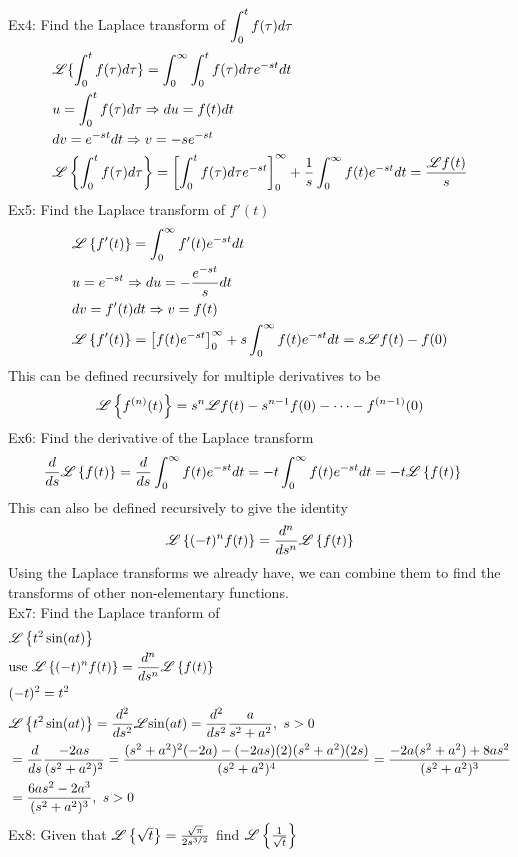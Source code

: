\documentclass[11pt, fleqn]{article}
\begin{document}
Ex4: Find the Laplace transform of $\displaystyle\int_0^t f(\tau)d\tau$
\begin{align*}
    &\mathscr{L}\{\int_0^t f(\tau)d\tau\}=\int_0^\infty\int_0^t f(\tau)d\tau e^{-st}dt\\
    &u=\int_0^t f(\tau)d\tau\Rightarrow du=f(t)dt\\
    &dv=e^{-st}dt\Rightarrow v=-se^{-st}\\
    &\mathscr{L}\left\{ \int_0^t f(\tau)d\tau \right\}=\left[ \int_0^t f(\tau)d\tau e^{-st} \right]_0^\infty+\frac{1}{s}\int_0^\infty f(t)e^{-st}dt=\frac{\mathscr{L}{f(t)}}{s}
\end{align*}
Ex5: Find the Laplace transform of $f'(t)$
\begin{align*}
    &\mathscr{L}\left\{ f'(t) \right\}=\int_0^\infty f'(t)e^{-st}dt\\
    &u=e^{-st}\Rightarrow du=-\frac{e^{-st}}{s}dt\\
    &dv=f'(t)dt\Rightarrow v=f(t)\\
    &\mathscr{L}\left\{ f'(t) \right\}=\left[ f(t)e^{-st} \right]_0^\infty+s\int_0^\infty f(t)e^{-st}dt=s\mathscr{L}{f(t)}-f(0)
\end{align*}
This can be defined recursively for multiple derivatives to be
$$\mathscr{L}\left\{ f^{(n)}(t) \right\}=s^n\mathscr{L}{f(t)}-s^{n-1}f(0)-\cdots-f^{(n-1)}(0)$$
Ex6: Find the derivative of the Laplace transform
\begin{align*}
    &\frac{d}{ds}\mathscr{L}\left\{ f(t) \right\}=\frac{d}{ds}\int_0^\infty f(t)e^{-st}dt=-t\int_0^{\infty}f(t)e^{-st}dt=-t\mathscr{L}\left\{ f(t) \right\}
\end{align*}
This can also be defined recursively to give the identity
$$\mathscr{L}\left\{ (-t)^nf(t) \right\}=\frac{d^n}{ds^n}\mathscr{L}\left\{ f(t) \right\}$$
Using the Laplace transforms we already have, we can combine them to find the transforms of other non-elementary functions.\\
Ex7: Find the Laplace tranform of 
\begin{align*}
    &\lap\brcurly{t^2\sin(at)}\\
    &\text{use }\lap\brcurly{(-t)^nf(t)}=\frac{d^n}{ds^n}\lap\brcurly{f(t)}\\
    &(-t)^2=t^2\\
    &\lap\brcurly{t^2\sin(at)}=\frac{d^2}{ds^2}\lap{\sin(at)}=\frac{d^2}{ds^2}\frac{a}{s^2+a^2},\ s>0\\
    &=\frac{d}{ds}\frac{-2as}{(s^2+a^2)^2}=\frac{(s^2+a^2)^2(-2a)-(-2as)(2)(s^2+a^2)(2s)}{(s^2+a^2)^4}=\frac{-2a(s^2+a^2)+8as^2}{(s^2+a^2)^3}\\
    &=\frac{6as^2-2a^3}{(s^2+a^2)^3},\ s>0
\end{align*}
Ex8: Given that $\mathscr{L}\left\{ \sqrt{t} \right\}=\frac{\sqrt{\pi}}{2s^{3/2}}$ find $\mathscr{L}\left\{ \frac{1}{\sqrt{t}} \right\}$
\end{document}
